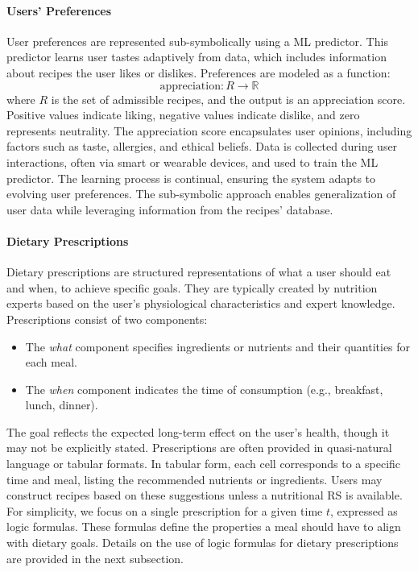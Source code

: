 \paragraph{Users' Preferences}\label{par:users-preferences}
%
User preferences are represented sub-symbolically using a \gls{ML} predictor.
%
This predictor learns user tastes adaptively from data, which includes information about recipes the user likes or dislikes.
%
Preferences are modeled as a function:
%
\begin{equation}
  \label{eq:users-preferences}
  \text{appreciation}: R \to \mathbb{R}
\end{equation}
%
where \( R \) is the set of admissible recipes, and the output is an appreciation score.
%
Positive values indicate liking, negative values indicate dislike, and zero represents neutrality.
%
The appreciation score encapsulates user opinions, including factors such as taste, allergies, and ethical beliefs.
%
Data is collected during user interactions, often via smart or wearable devices, and used to train the \gls{ML} predictor.
%
The learning process is continual, ensuring the system adapts to evolving user preferences.
%
The sub-symbolic approach enables generalization of user data while leveraging information from the recipes' database.


\paragraph{Dietary Prescriptions}\label{par:dietary-prescriptions}
%
Dietary prescriptions are structured representations of what a user should eat and when, to achieve specific goals.
%
They are typically created by nutrition experts based on the user's physiological characteristics and expert knowledge.
%
Prescriptions consist of two components:
%
\begin{itemize}
  \item The \emph{what} component specifies ingredients or nutrients and their quantities for each meal.
  \item The \emph{when} component indicates the time of consumption (e.g., breakfast, lunch, dinner).
\end{itemize}
%
The goal reflects the expected long-term effect on the user's health, though it may not be explicitly stated.
%
Prescriptions are often provided in quasi-natural language or tabular formats.
%
In tabular form, each cell corresponds to a specific time and meal, listing the recommended nutrients or ingredients.
%
Users may construct recipes based on these suggestions unless a nutritional \gls{RS} is available.
%
For simplicity, we focus on a single prescription for a given time \( t \), expressed as logic formulas.
%
These formulas define the properties a meal should have to align with dietary goals.
%
Details on the use of logic formulas for dietary prescriptions are provided in the next subsection.



